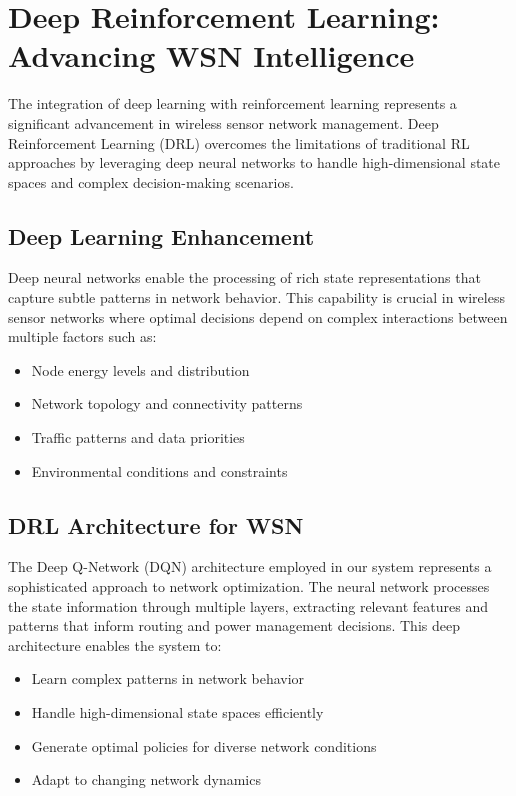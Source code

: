 \section{Deep Reinforcement Learning: Advancing WSN Intelligence}
The integration of deep learning with reinforcement learning represents a significant advancement in wireless sensor network management. Deep Reinforcement Learning (DRL) overcomes the limitations of traditional RL approaches by leveraging deep neural networks to handle high-dimensional state spaces and complex decision-making scenarios.

\subsection{Deep Learning Enhancement}
Deep neural networks enable the processing of rich state representations that capture subtle patterns in network behavior. This capability is crucial in wireless sensor networks where optimal decisions depend on complex interactions between multiple factors such as:

\begin{itemize}
\item Node energy levels and distribution
\item Network topology and connectivity patterns
\item Traffic patterns and data priorities
\item Environmental conditions and constraints
\end{itemize}

\subsection{DRL Architecture for WSN}
The Deep Q-Network (DQN) architecture employed in our system represents a sophisticated approach to network optimization. The neural network processes the state information through multiple layers, extracting relevant features and patterns that inform routing and power management decisions. This deep architecture enables the system to:

\begin{itemize}
\item Learn complex patterns in network behavior
\item Handle high-dimensional state spaces efficiently
\item Generate optimal policies for diverse network conditions
\item Adapt to changing network dynamics
\end{itemize}


